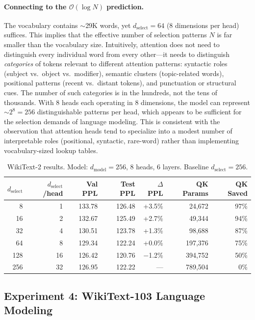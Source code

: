 \documentclass{article} %
\newcommand{\dmodel}{d_{\text{model}}}
\newcommand{\dselect}{d_{\text{select}}}
\newcommand{\BigO}{\mathcal{O}}
\begin{document}
\paragraph{Connecting to the $\BigO(\log N)$ prediction.}
The vocabulary contains $\sim$29K words, yet $\dselect = 64$ (8 dimensions per head) suffices. This implies that the effective number of selection patterns $N$ is far smaller than the vocabulary size. Intuitively, attention does not need to distinguish every individual word from every other---it needs to distinguish \emph{categories} of tokens relevant to different attention patterns: syntactic roles (subject vs.\ object vs.\ modifier), semantic clusters (topic-related words), positional patterns (recent vs.\ distant tokens), and punctuation or structural cues. The number of such categories is in the hundreds, not the tens of thousands. With 8 heads each operating in 8 dimensions, the model can represent $\sim\!2^8 = 256$ distinguishable patterns per head, which appears to be sufficient for the selection demands of language modeling. This is consistent with the observation that attention heads tend to specialize into a modest number of interpretable roles (positional, syntactic, rare-word) rather than implementing vocabulary-sized lookup tables.

\begin{table}[h]
\centering
\caption{WikiText-2 results. Model: $\dmodel = 256$, 8 heads, 6 layers. Baseline $\dselect = 256$.}
\label{tab:wt2}
\begin{tabular}{rrrrrrr}
\toprule
$\dselect$ & $\dselect$/head & Val PPL & Test PPL & $\Delta$PPL & QK Params & QK Saved \\
\midrule
8   & 1  & 133.78 & 126.48 & +3.5\%  & 24,672  & 97\% \\
16  & 2  & 132.67 & 125.49 & +2.7\%  & 49,344  & 94\% \\
32  & 4  & 130.51 & 123.78 & +1.3\%  & 98,688  & 87\% \\
64  & 8  & 129.34 & 122.24 & +0.0\%  & 197,376 & 75\% \\
128 & 16 & 126.42 & 120.76 & $-$1.2\% & 394,752 & 50\% \\
256 & 32 & 126.95 & 122.22 & --- & 789,504 & 0\% \\
\bottomrule
\end{tabular}
\end{table}


\subsection{Experiment 4: WikiText-103 Language Modeling}
\end{document}
